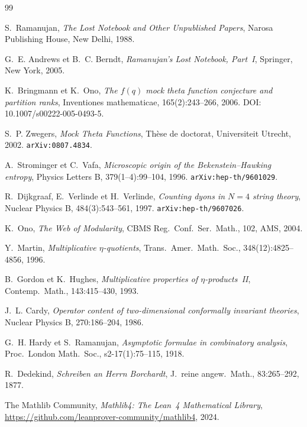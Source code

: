 \documentclass[11pt,a4paper]{article}
\theoremstyle{plain}
\theoremstyle{definition}
\begin{document}

\begin{thebibliography}{99}

S.~Ramanujan,
\emph{The Lost Notebook and Other Unpublished Papers},
Narosa Publishing House, New Delhi, 1988.

G.~E. Andrews et B.~C. Berndt,
\emph{Ramanujan's Lost Notebook, Part~I},
Springer, New York, 2005.

K.~Bringmann et K.~Ono,
\emph{The $f(q)$ mock theta function conjecture and partition ranks},
Inventiones mathematicae, 165(2):243--266, 2006.
DOI: 10.1007/s00222-005-0493-5.

S.~P. Zwegers,
\emph{Mock Theta Functions},
Thèse de doctorat, Universiteit Utrecht, 2002.
\texttt{arXiv:0807.4834}.

A.~Strominger et C.~Vafa,
\emph{Microscopic origin of the Bekenstein--Hawking entropy},
Physics Letters B, 379(1--4):99--104, 1996.
\texttt{arXiv:hep-th/9601029}.

R.~Dijkgraaf, E.~Verlinde et H.~Verlinde,
\emph{Counting dyons in $N=4$ string theory},
Nuclear Physics B, 484(3):543--561, 1997.
\texttt{arXiv:hep-th/9607026}.

K.~Ono,
\emph{The Web of Modularity},
CBMS Reg.\ Conf.\ Ser.\ Math., 102, AMS, 2004.

Y.~Martin,
\emph{Multiplicative $\eta$-quotients},
Trans.\ Amer.\ Math.\ Soc., 348(12):4825--4856, 1996.

B.~Gordon et K.~Hughes,
\emph{Multiplicative properties of $\eta$-products~II},
Contemp.\ Math., 143:415--430, 1993.

J.~L. Cardy,
\emph{Operator content of two-dimensional conformally invariant theories},
Nuclear Physics B, 270:186--204, 1986.

G.~H. Hardy et S.~Ramanujan,
\emph{Asymptotic formulae in combinatory analysis},
Proc.\ London Math.\ Soc., s2-17(1):75--115, 1918.

R.~Dedekind,
\emph{Schreiben an Herrn Borchardt},
J.\ reine angew.\ Math., 83:265--292, 1877.

The Mathlib Community,
\emph{Mathlib4: The Lean~4 Mathematical Library},
\url{https://github.com/leanprover-community/mathlib4}, 2024.

\end{thebibliography}
\end{document}
